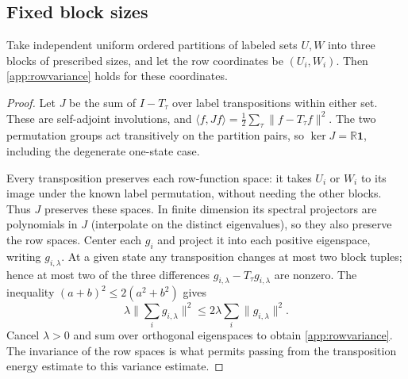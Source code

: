 \subsection{Fixed block sizes}
\begin{lemma}\label{app:fixed}
Take independent uniform ordered partitions of labeled sets $U,W$ into three
blocks of prescribed sizes, and let the row coordinates be $(U_i,W_i)$. Then
\eqref{app:rowvariance} holds for these coordinates.
\end{lemma}
\begin{proof}
Let $J$ be the sum of $I-T_\tau$ over label transpositions within either set.
These are self-adjoint involutions, and
$\langle f,Jf\rangle=\tfrac12\sum_\tau\lVert f-T_\tau f\rVert^2$.
The two permutation groups act transitively on the partition pairs, so
$\ker J=\mathbb R\mathbf 1$, including the degenerate one-state case.

Every transposition preserves each row-function space: it takes $U_i$ or
$W_i$ to its image under the known label permutation, without needing the
other blocks. Thus $J$ preserves these spaces. In finite dimension its
spectral projectors are polynomials in $J$ (interpolate on the distinct
eigenvalues), so they also preserve the row spaces. Center each $g_i$ and
project it into each positive eigenspace, writing $g_{i,\lambda}$.
At a given state any transposition changes at most two block tuples; hence
at most two of the three differences $g_{i,\lambda}-T_\tau g_{i,\lambda}$
are nonzero. The inequality $(a+b)^2\le2(a^2+b^2)$ gives
\[
 \lambda\Big\lVert\sum_i g_{i,\lambda}\Big\rVert^2
 \le2\lambda\sum_i\lVert g_{i,\lambda}\rVert^2.
\]
Cancel $\lambda>0$ and sum over orthogonal eigenspaces to obtain
\eqref{app:rowvariance}. The invariance of the row spaces is what permits
passing from the transposition energy estimate to this variance estimate.
\end{proof}

